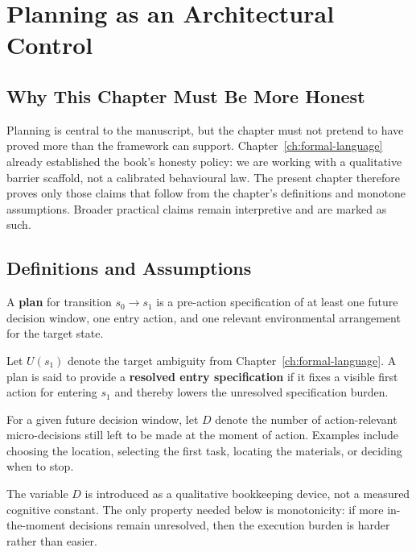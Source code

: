 \chapter{Planning as an Architectural Control}
\label{ch:planning}

\section{Why This Chapter Must Be More Honest}

Planning is central to the manuscript, but the chapter must not pretend to have
proved more than the framework can support. Chapter~\ref{ch:formal-language}
already established the book's honesty policy: we are working with a
qualitative barrier scaffold, not a calibrated behavioural law. The present
chapter therefore proves only those claims that follow from the chapter's
definitions and monotone assumptions. Broader practical claims remain
interpretive and are marked as such.

\section{Definitions and Assumptions}

\begin{definition}[Plan]
A \textbf{plan} for transition $s_0 \to s_1$ is a pre-action specification of
at least one future decision window, one entry action, and one relevant
environmental arrangement for the target state.
\end{definition}

\begin{definition}
Let $U(s_1)$ denote the target ambiguity from
Chapter~\ref{ch:formal-language}. A plan is said to provide a
\textbf{resolved entry specification} if it fixes a visible first action for
entering $s_1$ and thereby lowers the unresolved specification burden.
\end{definition}

\begin{definition}
For a given future decision window, let $D$ denote the number of
action-relevant micro-decisions still left to be made at the moment of action.
Examples include choosing the location, selecting the first task, locating the
materials, or deciding when to stop.
\end{definition}

\begin{remark}
The variable $D$ is introduced as a qualitative bookkeeping device, not a
measured cognitive constant. The only property needed below is monotonicity:
if more in-the-moment decisions remain unresolved, then the execution burden is
harder rather than easier.
\end{remark}

